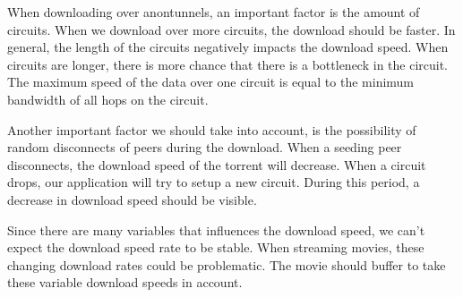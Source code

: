 		When downloading over anontunnels, an important factor is the amount of circuits. When we download over more circuits, the download should be faster. In general, the length of the circuits negatively impacts the download speed. When circuits are longer, there is more chance that there is a bottleneck in the circuit. The maximum speed of the data over one circuit is equal to the minimum bandwidth of all hops on the circuit.
		
		Another important factor we should take into account, is the possibility of random disconnects of peers during the download. When a seeding peer disconnects, the download speed of the torrent will decrease. When a circuit drops, our application will try to setup a new circuit. During this period, a decrease in download speed should be visible.
		
		Since there are many variables that influences the download speed, we can't expect the download speed rate to be stable. When streaming movies, these changing download rates could be problematic. The movie should buffer to take these variable download speeds in account.